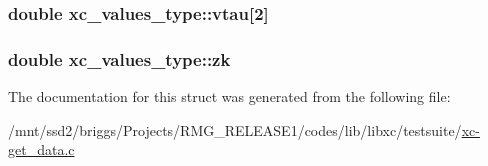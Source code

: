 \hypertarget{structxc__values__type_a325f2638089774311f5226f1d678c0dd}{
\subsubsection[{vtau}]{\setlength{\rightskip}{0pt plus 5cm}double xc\-\_\-values\-\_\-type\-::vtau\mbox{[}2\mbox{]}}}\label{structxc__values__type_a325f2638089774311f5226f1d678c0dd}
\hypertarget{structxc__values__type_a31b0888d60141aac90a16f6bdde009de}{
\subsubsection[{zk}]{\setlength{\rightskip}{0pt plus 5cm}double xc\-\_\-values\-\_\-type\-::zk}}\label{structxc__values__type_a31b0888d60141aac90a16f6bdde009de}


The documentation for this struct was generated from the following file\-:\begin{DoxyCompactItemize}
\item 
/mnt/ssd2/briggs/\-Projects/\-R\-M\-G\-\_\-\-R\-E\-L\-E\-A\-S\-E1/codes/lib/libxc/testsuite/\hyperlink{xc-get__data_8c}{xc-\/get\-\_\-data.\-c}\end{DoxyCompactItemize}
